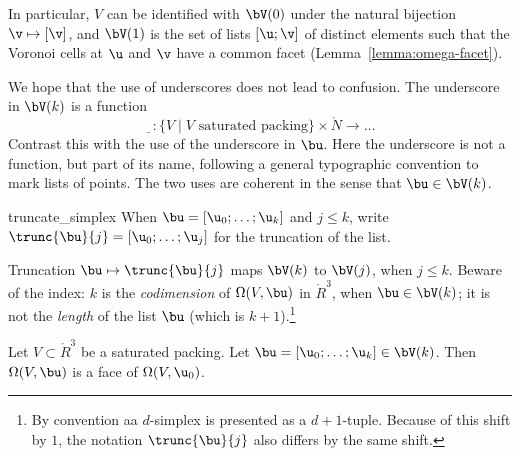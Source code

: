 In particular, $V$ can be identified with $\bV(0)$ under the natural
bijection $\v\mapsto[\v]$, and $\bV(1)$ is the set of lists $[\u;\v]$
of distinct elements such that the Voronoi cells at $ \u$ and $\v$
have a common facet (Lemma~\ref{lemma:omega-facet}).  

\begin{notation}[underscore]
  We hope that the use of underscores does not lead to confusion.  The
  underscore in $\bV(k)$ is a function
\begin{displaymath} 
\underline{\phantom V}:\{V \mid \text{$V$ saturated packing} \}
\times \ring{N} \to \ldots
\end{displaymath}
Contrast this with the use of the underscore in $\bu$.  Here the
underscore is not a function, but part of its name, following a
general typographic convention to mark lists of points. The two uses
are coherent in the sense that $\bu\in\bV(k)$.
\end{notation}

\begin{notation}[$\trunc{\bu}{j}$]
%
 {truncate\_simplex}
When $\bu=[\u_0;\ldots;\u_k]$ and $j\le k$, write
$\trunc{\bu}{j} = 
[\u_0;\ldots;\u_j]$ for the truncation of the list.  
%
\end{notation}

Truncation $\bu\mapsto\trunc{\bu}{j}$ maps $\bV(k)$ to $\bV(j)$, when
$j\le k$.  Beware of the index: $k$ is the {\it codimension} of
$\Omega(V,\bu)$ in $\ring{R}^3$, when $\bu\in \bV(k)$; it is not the
{\it length} of the list $\bu$ (which is $k+1$).\footnote{By
  convention aa $d$-simplex is presented as a $d+1$-tuple.  Because of
  this shift by $1$, the notation $\trunc{\bu}{j}$ also differs by the
  same shift.}


\begin{lemma}\label{lemma:omega-face}  
Let $V\subset\ring{R}^3$ be a saturated packing.
Let $\bu=[\u_0;\ldots;\u_{k}]\in \bV(k)$.  
Then $\Omega(V,\bu)$ is a face of $\Omega(V,\u_0)$.
\end{lemma}

